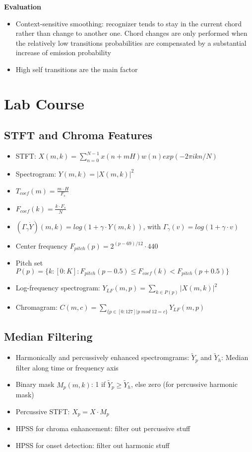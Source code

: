 \documentclass{scrartcl}
\begin{document}
\textbf{Evaluation}
\begin{itemize}
    \item
        Context-sensitive smoothing: recognizer tends to stay in the current chord rather than change to another one. Chord changes are only performed when the relatively low transitions probabilities are compensated by a substantial increase of emission probability
    \item
        High self transitions are the main factor
\end{itemize}

\newpage

\section{Lab Course}
\subsection{STFT and Chroma Features}
\begin{itemize}
    \item
        STFT: $X(m,k) = \sum_{n=0}^{N-1} x(n+mH)w(n)exp(-2 \pi i k n/N)$
    \item
        Spectrogram: $ Y(m,k) = |X(m,k)|^2$
    \item
        $T_{coef}(m) = \frac{m \cdot H}{F_s}$
    \item
        $F_{coef}(k) = \frac{k \cdot F_s}{N}$\\
    \item
        $(\Gamma_{\gamma} \dot Y)(m, k) = log(1 + \gamma \cdot Y(m,k))$, with $\Gamma_{\gamma}(v) = log(1 + \gamma \cdot v)$ \\
    \item
        Center frequency $F_{pitch}(p) = 2^{(p-69)/12} \cdot 440$
    \item
        Pitch set $P(p) = \{k: [0:K]: F_{pitch}(p-0.5) \leq F_{coef}(k) < F_{pitch}(p+0.5)\}$
    \item
        Log-frequency spectrogram: $Y_{LF}(m,p) = \sum_{k \in P(p)} |X(m,k)|^2$
    \item
        Chromagram: $C(m,c) = \sum_{\{ p \in [0:127] | p \; mod \; 12 = c\}} Y_{LF}(m,p)$
\end{itemize}
\subsection{Median Filtering}
\begin{itemize}
    \item
        Harmonically and percussively enhanced spectromgrams: $\tilde{Y}_p$ and $\tilde{Y}_h$: Median filter along time or frequency axis
    \item
        Binary mask $M_p(m,k)$: 1 if $\tilde{Y}_p \geq \tilde{Y}_h$, else zero (for percussive harmonic mask)
    \item
        Percussive STFT: $X_p = X \cdot M_p$
    \item
        HPSS for chroma enhancement: filter out percussive stuff
    \item
        HPSS for onset detection: filter out harmonic stuff
\end{itemize}
\end{document}
